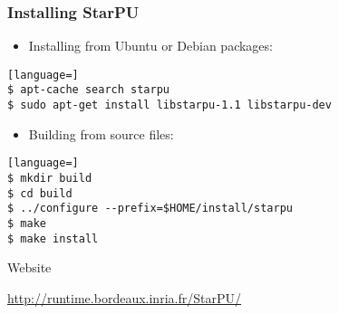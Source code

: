 \begin{frame}[fragile]
  \frametitle{Installing StarPU}
  \begin{itemize}
  \item Installing from Ubuntu or Debian packages:
  \end{itemize}
  \begin{block}{}
\begin{lstlisting}[language=]
$ apt-cache search starpu
$ sudo apt-get install libstarpu-1.1 libstarpu-dev
\end{lstlisting}
  \end{block}
  \begin{itemize}
  \item Building from source files:
  \end{itemize}
  \begin{block}{}
\begin{lstlisting}[language=]
$ mkdir build
$ cd build
$ ../configure --prefix=$HOME/install/starpu
$ make
$ make install
\end{lstlisting}
  \end{block}
  \begin{alertblock}{Website}
    \begin{center}
    \url{http://runtime.bordeaux.inria.fr/StarPU/}
    \end{center}
  \end{alertblock}
\end{frame}

